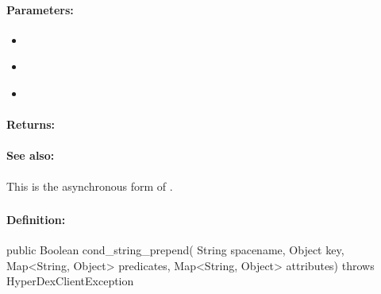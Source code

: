 \paragraph{Parameters:}
\begin{itemize}[noitemsep]
\item {}\\

\item {}\\

\item {}\\

\end{itemize}

\paragraph{Returns:}


\paragraph{See also:}  This is the asynchronous form of .

\pagebreak
\subsubsection{}
\label{api:java:cond_string_prepend}


\paragraph{Definition:}
\begin{javacode}
public Boolean cond_string_prepend(
        String spacename,
        Object key,
        Map<String, Object> predicates,
        Map<String, Object> attributes) throws HyperDexClientException
\end{javacode}


